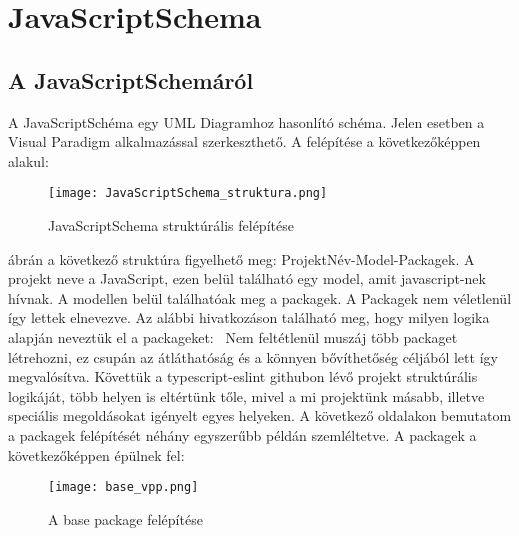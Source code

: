 \chapter*{JavaScriptSchema}
\section{A JavaScriptSchemáról}

\noindent

A JavaScriptSchéma egy UML Diagramhoz hasonlító schéma. Jelen esetben a Visual Paradigm alkalmazással szerkeszthető.
A felépítése a következőképpen alakul:

\begin{figure}[!htbp]
      \caption{JavaScriptSchema struktúrális felépítése}\label{fig:JavaScriptSchema_struktura}
      \centering
      \texttt{[image: JavaScriptSchema\_struktura.png]}
\end{figure}

 ábrán a következő struktúra figyelhető meg: ProjektNév-Model-Packagek.
A projekt neve a JavaScript, ezen belül található egy model, amit javascript-nek hívnak. A modellen belül találhatóak meg a packagek.
A Packagek nem véletlenül így lettek elnevezve. Az alábbi hivatkozáson található meg, hogy milyen logika alapján neveztük el a packageket:~\cite{typescript-eslint}
Nem feltétlenül muszáj több packaget létrehozni, ez csupán az átláthatóság és a könnyen bővíthetőség céljából lett így megvalósítva.
Követtük a typescript-eslint githubon lévő projekt struktúrális logikáját, több helyen is eltértünk tőle, mivel a mi projektünk másabb, illetve speciális megoldásokat igényelt egyes helyeken.
A következő oldalakon bemutatom a packagek felépítését néhány egyszerűbb példán szemléltetve.
A packagek a következőképpen épülnek fel:
\begin{figure}[!htbp]
      \caption{A base package felépítése}\label{fig:base_vpp}
      \centering
      \texttt{[image: base\_vpp.png]}
\end{figure}

